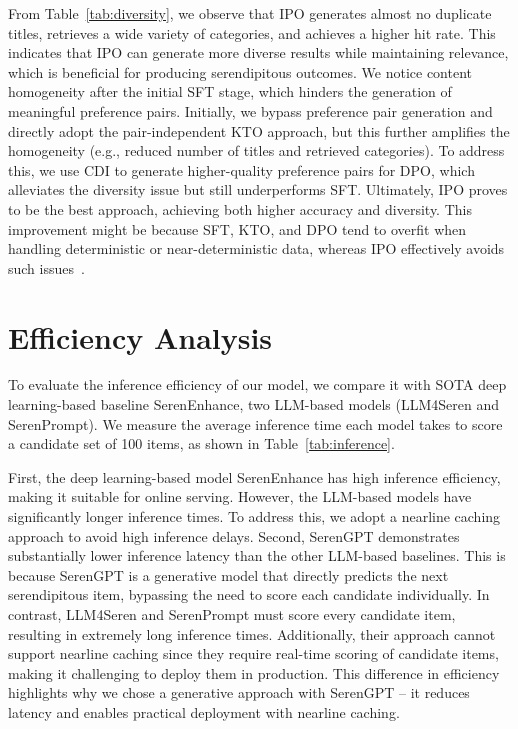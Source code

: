 From Table~\ref{tab:diversity}, we observe that IPO generates almost no duplicate titles, retrieves a wide variety of categories, and achieves a higher hit rate. This indicates that IPO can generate more diverse results while maintaining relevance, which is beneficial for producing serendipitous outcomes. We notice content homogeneity after the initial SFT stage, which hinders the generation of meaningful preference pairs. Initially, we bypass preference pair generation and directly adopt the pair-independent KTO approach, but this further amplifies the homogeneity (e.g., reduced number of titles and retrieved categories). To address this, we use CDI to generate higher-quality preference pairs for DPO, which alleviates the diversity issue but still underperforms SFT. Ultimately, IPO proves to be the best approach, achieving both higher accuracy and diversity. This improvement might be because SFT, KTO, and DPO tend to overfit when handling deterministic or near-deterministic data, whereas IPO effectively avoids such issues~\cite {azar2024general}.


\section{Efficiency Analysis}\label{app:efficiency}
To evaluate the inference efficiency of our model, we compare it with SOTA deep learning-based baseline SerenEnhance, two LLM-based models (LLM4Seren and SerenPrompt). We measure the average inference time each model takes to score a candidate set of 100 items, as shown in Table~\ref{tab:inference}. 

First, the deep learning-based model SerenEnhance has high inference efficiency, making it suitable for online serving. However, the LLM-based models have significantly longer inference times. To address this, we adopt a nearline caching approach to avoid high inference delays. Second, SerenGPT demonstrates substantially lower inference latency than the other LLM-based baselines. This is because SerenGPT is a generative model that directly predicts the next serendipitous item, bypassing the need to score each candidate individually. In contrast, LLM4Seren and SerenPrompt must score every candidate item, resulting in extremely long inference times. Additionally, their approach cannot support nearline caching since they require real-time scoring of candidate items, making it challenging to deploy them in production. This difference in efficiency highlights why we chose a generative approach with SerenGPT -- it reduces latency and enables practical deployment with nearline caching.

